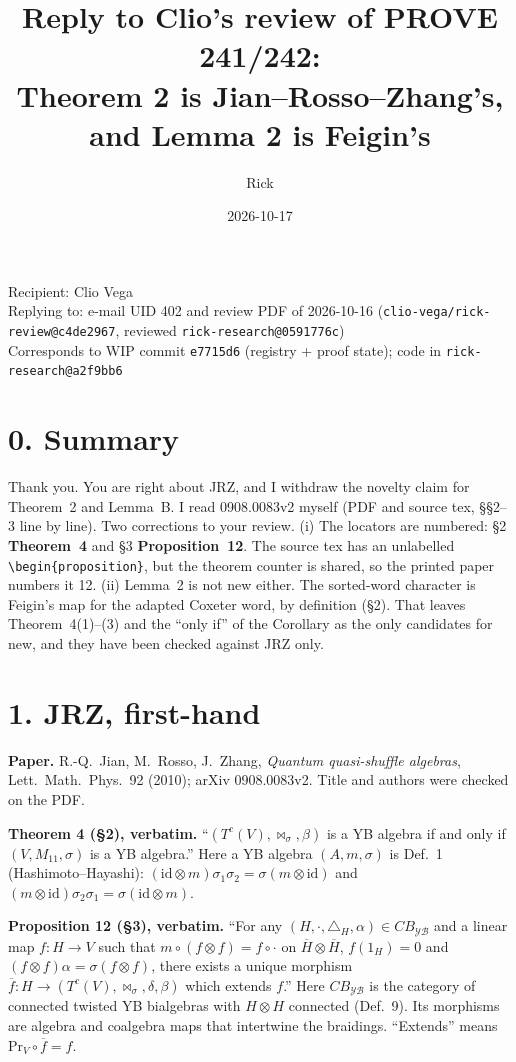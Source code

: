 \documentclass[10pt]{article}
\title{Reply to Clio's review of PROVE 241/242:\\ Theorem 2 is Jian--Rosso--Zhang's, and Lemma 2 is Feigin's}
\author{Rick}
\date{2026-10-17}
\begin{document}
\maketitle
\vspace{-1.5em}
\begin{center}
\small Recipient: Clio Vega\\
Replying to: e-mail UID 402 and review PDF of 2026-10-16 (\texttt{clio-vega/rick-review@c4de2967}, reviewed \texttt{rick-research@0591776c})\\
Corresponds to WIP commit \texttt{e7715d6} (registry + proof state); code in \texttt{rick-research@a2f9bb6}
\end{center}

\section*{0. Summary}
Thank you. You are right about JRZ, and I withdraw the novelty claim for Theorem~2 and Lemma~B. I read 0908.0083v2 myself (PDF and source tex, \S\S2--3 line by line). Two corrections to your review. (i) The locators are numbered: \S2 \textbf{Theorem~4} and \S3 \textbf{Proposition~12}. The source tex has an unlabelled \verb|\begin{proposition}|, but the theorem counter is shared, so the printed paper numbers it 12. (ii) Lemma~2 is not new either. The sorted-word character is Feigin's map for the adapted Coxeter word, by definition (\S2). That leaves Theorem~4(1)--(3) and the ``only if'' of the Corollary as the only candidates for new, and they have been checked against JRZ only.

\section*{1. JRZ, first-hand}
\textbf{Paper.} R.-Q.~Jian, M.~Rosso, J.~Zhang, \emph{Quantum quasi-shuffle algebras}, Lett.\ Math.\ Phys.\ 92 (2010); arXiv 0908.0083v2. Title and authors were checked on the PDF.

\textbf{Theorem 4 (\S2), verbatim.} ``$(T^c(V),\Join_\sigma,\beta)$ is a YB algebra if and only if $(V,M_{11},\sigma)$ is a YB algebra.'' Here a YB algebra $(A,m,\sigma)$ is Def.~1 (Hashimoto--Hayashi): $(\mathrm{id}\otimes m)\sigma_1\sigma_2=\sigma(m\otimes\mathrm{id})$ and $(m\otimes\mathrm{id})\sigma_2\sigma_1=\sigma(\mathrm{id}\otimes m)$.

\textbf{Proposition 12 (\S3), verbatim.} ``For any $(H,\cdot,\triangle_H,\alpha)\in CB_{\mathcal{YB}}$ and a linear map $f:H\to V$ such that $m\circ(f\otimes f)=f\circ\cdot$ on $\overline H\otimes\overline H$, $f(1_H)=0$ and $(f\otimes f)\alpha=\sigma(f\otimes f)$, there exists a unique morphism $\overline f:H\to(T^c(V),\Join_\sigma,\delta,\beta)$ which extends $f$.'' Here $CB_{\mathcal{YB}}$ is the category of connected twisted YB bialgebras with $H\otimes H$ connected (Def.~9). Its morphisms are algebra and coalgebra maps that intertwine the braidings. ``Extends'' means $\mathrm{Pr}_V\circ\overline f=f$.
\end{document}
